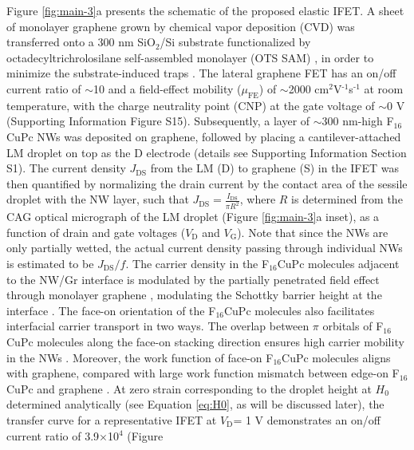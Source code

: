Figure \ref{fig:main-3}a presents the schematic of the proposed elastic
IFET. A sheet of monolayer graphene grown by chemical vapor
deposition (CVD) was transferred onto a 300 nm SiO\(_{\text{2}}\)/Si substrate
functionalized by octadecyltrichrolosilane self-assembled monolayer
(OTS SAM) \cite{Yan_2011}, in order to minimize the substrate-induced
traps \cite{Wang_2011}.  The lateral graphene FET has an on/off current
ratio of \(\sim\)10 and a field-effect mobility (\(\mu_{\mathrm{FE}}\))
of \(\sim\)2000 cm\(^{\text{2}}\)V\(^{\text{-1}}\)s\(^{\text{-1}}\) at room temperature, with the charge
neutrality point (CNP) at the gate voltage of \(\sim\)0 V (Supporting Information Figure S15). Subsequently, a layer of \(\sim\)300 nm-high
F\(_{\text{16}}\)CuPc NWs was deposited on graphene, followed by placing a
cantilever-attached LM droplet on top as the D electrode (details see
Supporting Information Section S1).  The current density
\(J_{\mathrm{DS}}\) from the LM (D) to graphene (S) in the IFET was
then quantified by normalizing the drain current by the contact area
of the sessile droplet with the NW layer, such that \(J_{\mathrm{DS}}
 = {\displaystyle \frac{I_{\mathrm{DS}}}{\pi R^{2}}}\), where \(R\) is
determined from the CAG optical micrograph of the LM droplet (Figure
\ref{fig:main-3}a inset), as a function of drain and gate voltages
(\(V_{\mathrm{D}}\) and \(V_{\mathrm{G}}\)). Note that since the NWs are
only partially wetted, the actual current density passing through
individual NWs is estimated to be \(J_{\mathrm{DS}}/f\). The carrier
density in the F\(_{\text{16}}\)CuPc molecules adjacent to the NW/Gr interface
is modulated by the partially penetrated field effect through
monolayer graphene \cite{Tian_2016,Shih2015Partially}, modulating the
Schottky barrier height at the interface \cite{Yang2012Barristor}. The
face-on orientation of the F\(_{\text{16}}\)CuPc molecules also facilitates
interfacial carrier transport in two ways. The overlap between \(\pi\)
orbitals of F\(_{\text{16}}\)CuPc molecules along the face-on stacking direction
ensures high carrier mobility in the NWs \cite{Bao_1998}. Moreover, the
work function of face-on F\(_{\text{16}}\)CuPc molecules aligns with graphene,
compared with large work function mismatch between edge-on F\(_{\text{16}}\)CuPc
and graphene \cite{Mao_2010_F16_level_orien,Ren_2011_F16Gr_Elevel}. At
zero strain corresponding to the droplet height at \(H_{0}\) determined
analytically (see Equation \ref{eq:H0}, as will be discussed later), the
transfer curve for a representative IFET at \(V_{\mathrm{D}}\)= 1 V
demonstrates an on/off current ratio of 3.9\(\times\)10\(^{\text{4}}\) (Figure
